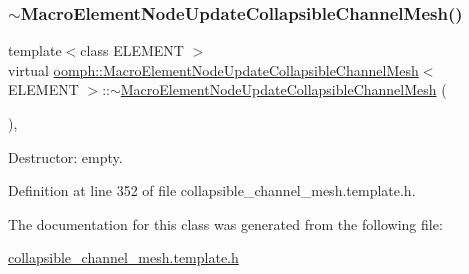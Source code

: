 \subsubsection{\texorpdfstring{$\sim$\+Macro\+Element\+Node\+Update\+Collapsible\+Channel\+Mesh()}{~MacroElementNodeUpdateCollapsibleChannelMesh()}}
{\footnotesize\ttfamily template$<$class E\+L\+E\+M\+E\+NT $>$ \\
virtual \hyperlink{classoomph_1_1MacroElementNodeUpdateCollapsibleChannelMesh}{oomph\+::\+Macro\+Element\+Node\+Update\+Collapsible\+Channel\+Mesh}$<$ E\+L\+E\+M\+E\+NT $>$\+::$\sim$\hyperlink{classoomph_1_1MacroElementNodeUpdateCollapsibleChannelMesh}{Macro\+Element\+Node\+Update\+Collapsible\+Channel\+Mesh} (\begin{DoxyParamCaption}{ }\end{DoxyParamCaption})\hspace{0.3cm}{\ttfamily [inline]}, {\ttfamily [virtual]}}



Destructor\+: empty. 



Definition at line 352 of file collapsible\+\_\+channel\+\_\+mesh.\+template.\+h.



The documentation for this class was generated from the following file\+:\begin{DoxyCompactItemize}
\item 
\hyperlink{collapsible__channel__mesh_8template_8h}{collapsible\+\_\+channel\+\_\+mesh.\+template.\+h}\end{DoxyCompactItemize}
